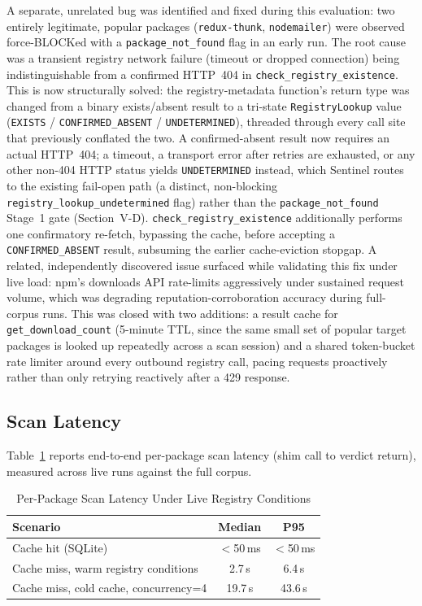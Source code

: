 \documentclass[journal]{IEEEtran}
\begin{document}
A separate, unrelated bug was identified and fixed during this evaluation: two entirely legitimate, popular
packages (\texttt{redux-thunk}, \texttt{nodemailer}) were observed force-BLOCKed with a
\texttt{package\_not\_found} flag in an early run. The root cause was a transient registry network failure
(timeout or dropped connection) being indistinguishable from a confirmed HTTP~404 in
\texttt{check\_registry\_existence}. This is now structurally solved: the registry-metadata function's return
type was changed from a binary exists/absent result to a tri-state \texttt{RegistryLookup} value
(\texttt{EXISTS} / \texttt{CONFIRMED\_ABSENT} / \texttt{UNDETERMINED}), threaded through every call site that
previously conflated the two. A confirmed-absent result now requires an actual HTTP~404; a timeout, a
transport error after retries are exhausted, or any other non-404 HTTP status yields \texttt{UNDETERMINED}
instead, which Sentinel routes to the existing fail-open path (a distinct, non-blocking
\texttt{registry\_lookup\_undetermined} flag) rather than the \texttt{package\_not\_found} Stage~1 gate
(Section~V-D). \texttt{check\_registry\_existence} additionally performs one confirmatory re-fetch,
bypassing the cache, before accepting a \texttt{CONFIRMED\_ABSENT} result, subsuming the earlier
cache-eviction stopgap. A related, independently discovered issue surfaced while validating this fix under
live load: npm's downloads API rate-limits aggressively under sustained request volume, which was
degrading reputation-corroboration accuracy during full-corpus runs. This was closed with two additions: a
result cache for \texttt{get\_download\_count} (5-minute TTL, since the same small set of popular target
packages is looked up repeatedly across a scan session) and a shared token-bucket rate limiter around every
outbound registry call, pacing requests proactively rather than only retrying reactively after a
429 response.

\subsection{Scan Latency}
Table~\ref{tab:latency} reports end-to-end per-package scan latency (shim call to verdict return), measured
across live runs against the full corpus.

\begin{table}[t]
\caption{Per-Package Scan Latency Under Live Registry Conditions}
\label{tab:latency}
\centering
\begin{tabular}{@{}lcc@{}}
\toprule
\textbf{Scenario} & \textbf{Median} & \textbf{P95} \\
\midrule
Cache hit (SQLite)                    & $<$50\,ms         & $<$50\,ms \\
Cache miss, warm registry conditions  & 2.7\,s            & 6.4\,s \\
Cache miss, cold cache, concurrency=4 & 19.7\,s           & 43.6\,s \\
\bottomrule
\end{tabular}
\end{table}
\end{document}
